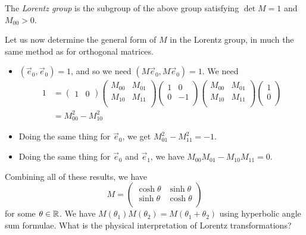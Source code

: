 \documentclass{../../template/note}
\begin{document}
    \begin{definition}
        The \emph{Lorentz group} is the subgroup of the above group satisfying \(\det M = 1\) and \(M_{00} > 0\).
    \end{definition}
    Let us now determine the general form of \(M\) in the Lorentz group, in much the same method as for orthogonal matrices.
    \begin{itemize}
        \item \((\vec e_0, \vec e_0) = 1\), and so we need \((M \vec e_0, M \vec e_0) = 1\). We need
        \begin{align*}
            1 &= \begin{pmatrix}
             1 & 0
            \end{pmatrix} \begin{pmatrix}
             M_{00} & M_{01} \\
             M_{10} & M_{11} \\
            \end{pmatrix} \begin{pmatrix}
             1 & 0 \\
             0 & -1 \\
            \end{pmatrix} \begin{pmatrix}
             M_{00} & M_{01} \\
             M_{10} & M_{11} \\
            \end{pmatrix} \begin{pmatrix}
             1 \\
             0 \\
            \end{pmatrix} \\
            &= M_{00}^2 - M_{10}^2
        \end{align*}
        \item Doing the same thing for \(\vec e_0\), we get \(M_{01}^2 - M_{11}^2 = -1\).
        \item Doing the same thing for \(\vec e_0\) and \(\vec e_1\), we have \(M_{00}M_{01}-M_{10}M_{11}=0\).
    \end{itemize}
    Combining all of these results, we have
    \[
        M = \begin{pmatrix}
         \cosh \theta & \sinh \theta \\
         \sinh \theta & \cosh \theta \\
        \end{pmatrix}
    \]
    for some \(\theta \in \mathbb R\). We have \(M(\theta_1)M(\theta_2) = M(\theta_1 + \theta_2)\) using hyperbolic angle sum formulae. What is the physical interpretation of Lorentz transformations?
    
\end{document}
